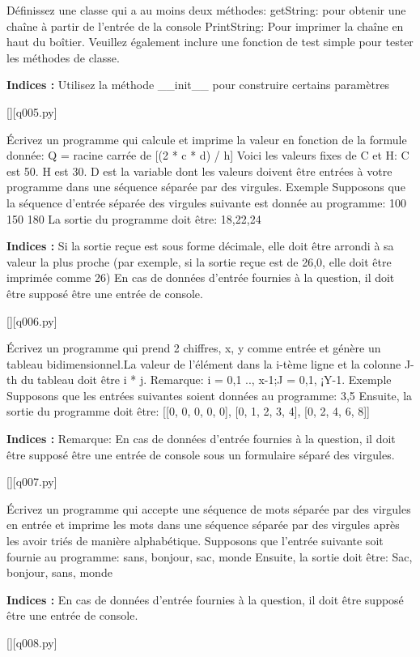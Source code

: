 \question
Définissez une classe qui a au moins deux méthodes:
getString: pour obtenir une chaîne à partir de l'entrée de la console
PrintString: Pour imprimer la chaîne en haut du boîtier.
Veuillez également inclure une fonction de test simple pour tester les méthodes de classe.
\par
\textbf{Indices : }Utilisez la méthode \_\_init\_\_ pour construire certains paramètres
\renewcommand{\nomfichier}{q005.py}
\begin{solution}
    \pythonfile{\chemincode \nomfichier}[][q005.py]
\end{solution}


\question
Écrivez un programme qui calcule et imprime la valeur en fonction de la formule donnée:
Q = racine carrée de [(2 * c * d) / h]
Voici les valeurs fixes de C et H:
C est 50. H est 30.
D est la variable dont les valeurs doivent être entrées à votre programme dans une séquence séparée par des virgules.
Exemple
Supposons que la séquence d'entrée séparée des virgules suivante est donnée au programme:
100 150 180
La sortie du programme doit être:
18,22,24
\par
\textbf{Indices : }Si la sortie reçue est sous forme décimale, elle doit être arrondi à sa valeur la plus proche (par exemple, si la sortie reçue est de 26,0, elle doit être imprimée comme 26)
En cas de données d'entrée fournies à la question, il doit être supposé être une entrée de console.
\renewcommand{\nomfichier}{q006.py}
\begin{solution}
    \pythonfile{\chemincode \nomfichier}[][q006.py]
\end{solution}


\question
Écrivez un programme qui prend 2 chiffres, x, y comme entrée et génère un tableau bidimensionnel.La valeur de l'élément dans la i-tème ligne et la colonne J-th du tableau doit être i * j.
Remarque: i = 0,1 .., x-1;J = 0,1, ¡Y-1.
Exemple
Supposons que les entrées suivantes soient données au programme:
3,5
Ensuite, la sortie du programme doit être:
[[0, 0, 0, 0, 0], [0, 1, 2, 3, 4], [0, 2, 4, 6, 8]]
\par
\textbf{Indices : }Remarque: En cas de données d'entrée fournies à la question, il doit être supposé être une entrée de console sous un formulaire séparé des virgules.
\renewcommand{\nomfichier}{q007.py}
\begin{solution}
    \pythonfile{\chemincode \nomfichier}[][q007.py]
\end{solution}


\question
Écrivez un programme qui accepte une séquence de mots séparée par des virgules en entrée et imprime les mots dans une séquence séparée par des virgules après les avoir triés de manière alphabétique.
Supposons que l'entrée suivante soit fournie au programme:
sans, bonjour, sac, monde
Ensuite, la sortie doit être:
Sac, bonjour, sans, monde
\par
\textbf{Indices : }En cas de données d'entrée fournies à la question, il doit être supposé être une entrée de console.
\renewcommand{\nomfichier}{q008.py}
\begin{solution}
    \pythonfile{\chemincode \nomfichier}[][q008.py]
\end{solution}


